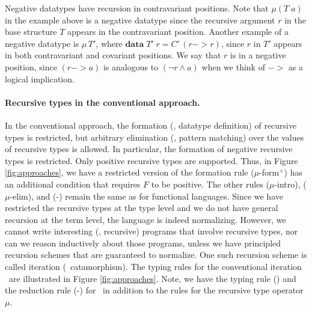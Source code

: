 Negative datatypes have recursion in contravariant positions.
Note that $\mu(T\;a)$ in the example above is a negative datatype
since the recursive argument $r$ in the base structure $T$ appears
in the contravariant position. Another example of a negative datatype is
$\mu\,T'$, where $\textbf{data}\;T'\;r = C'\,(r -> r)$, since $r$ in $T'$
appears in both contravariant and covariant positions.
We say that $r$ is in a negative position, since $(r -> a)$ is analogous to
$(\neg r \land a)$ when we think of $->$ as a logical implication.


\paragraph{Recursive types in the conventional approach.}
In the conventional approach, the formation (\ie, datatype definition) of
recursive types is restricted, but arbitrary elimination (\ie, pattern matching)
over the values of recursive types is allowed. In particular, the formation of
negative recursive types is restricted. Only positive recursive types are
supported. Thus, in Figure \ref{fig:approaches}, we have a restricted version of
the formation rule {\small($\mu$-form$^{+}$)} has an additional condition that
requires $F$ to be positive. The other rules {\small($\mu$-intro)},
{\small($\mu$-elim)}, and {\small(\unIn-\In)} remain the same as for
functional languages. Since we have restricted the recursive types
at the type level and we do not have general recursion at the term level,
the language is indeed normalizing. However, we cannot write
interesting (\ie, recursive) programs that involve recursive types, nor
can we reason inductively about those programs, unless we have principled recursion
schemes that are guaranteed to normalize. One such recursion scheme is called
iteration (\aka\ catamorphism). The typing rules for the conventional iteration
\It\ are illustrated in Figure \ref{fig:approaches}. Note, we have the typing
rule {\small(\It)} and the reduction rule {\small(\It-\In)} for \It\,
in addition to the rules for the recursive type operator $\mu$.

